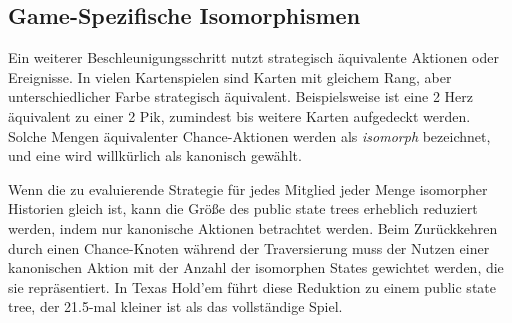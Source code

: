 \subsection{Game-Spezifische Isomorphismen}

Ein weiterer Beschleunigungsschritt nutzt strategisch äquivalente Aktionen oder Ereignisse.
In vielen Kartenspielen sind Karten mit gleichem Rang, aber unterschiedlicher Farbe strategisch äquivalent.
Beispielsweise ist eine 2 Herz äquivalent zu einer 2 Pik, zumindest bis weitere Karten aufgedeckt werden.
Solche Mengen äquivalenter Chance-Aktionen werden als \emph{isomorph} bezeichnet, und eine wird willkürlich als kanonisch gewählt.

Wenn die zu evaluierende Strategie für jedes Mitglied jeder Menge isomorpher Historien gleich ist, kann die Größe des public state trees erheblich reduziert werden, indem nur kanonische Aktionen betrachtet werden.
Beim Zurückkehren durch einen Chance-Knoten während der Traversierung muss der Nutzen einer kanonischen Aktion mit der Anzahl der isomorphen States gewichtet werden, die sie repräsentiert.
In Texas Hold'em führt diese Reduktion zu einem public state tree, der 21.5-mal kleiner ist als das vollständige Spiel.
